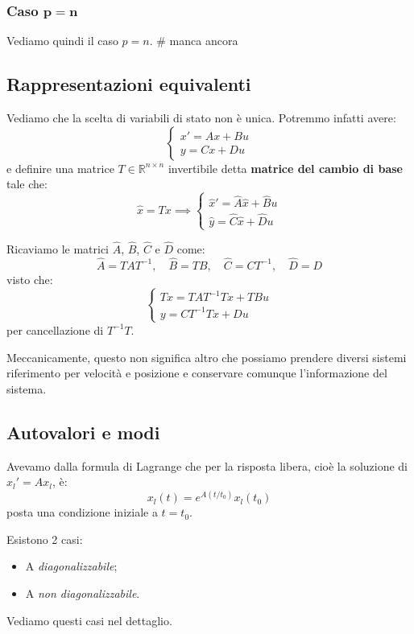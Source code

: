 \documentclass[a4paper,11pt]{article}
\begin{document}
\subsubsection{Caso $\mathbf{p = n}$}
Vediamo quindi il caso $p = n$. # manca ancora


\subsection{Rappresentazioni equivalenti}
Vediamo che la scelta di variabili di stato non è unica.
Potremmo infatti avere:
\[
	\begin{cases}
		x' = Ax + Bu \\
		y = Cx + Du
	\end{cases}
\]
e definire una matrice $T \in \mathbb{R}^{n \times n}$ invertibile detta \textbf{matrice del cambio di base} tale che:
$$
\hat{x} = Tx \implies 
\begin{cases}
	\hat{x}' = \hat{A}\hat{x} + \hat{B}u \\
	\hat{y} = \hat{C}\hat{x} + \hat{D}u
\end{cases}
$$

Ricaviamo le matrici $\hat{A}$, $\hat{B}$, $\hat{C}$ e $\hat{D}$ come:
$$
\hat{A} = T A T^{-1}, \quad \hat{B} = TB, \quad \hat{C} = CT^{-1}, \quad \hat{D} = D
$$
visto che:
\[
	\begin{cases}
		T x = T A T^{-1} T x + T B u \\ 
		y = C T^{-1} T x + D u
	\end{cases}
\]
per cancellazione di $T^{-1} T$.

Meccanicamente, questo non significa altro che possiamo prendere diversi sistemi riferimento per velocità e posizione e conservare comunque l'informazione del sistema.

\subsection{Autovalori e modi}
Avevamo dalla formula di Lagrange che per la risposta libera, cioè la soluzione di $x_l' = Ax_l$, è:
$$
	x_l(t) = e^{A(t / t_0)}x_l(t_0)
$$
posta una condizione iniziale a $t = t_0$.

Esistono 2 casi:
\begin{itemize}
	\item A \textit{diagonalizzabile};
	\item A \textit{non diagonalizzabile}.
\end{itemize}

Vediamo questi casi nel dettaglio.
\end{document}
